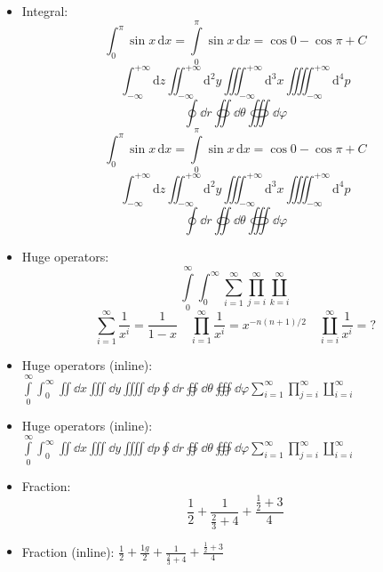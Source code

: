 \documentclass{article}
\begin{document}
\begin{itemize}
  \item Integral:
        \[
            \int_0^\pi        \sin x \, \mathrm{d} x
          = \int\limits_0^\pi \sin x \, \mathrm{d} x
          = \cos 0 - \cos\pi + C
        \]
        \[
          \int_{-\infty}^{+\infty}    \mathrm{d} z
          \iint_{-\infty}^{+\infty}   \mathrm{d}^2 y
          \iiint_{-\infty}^{+\infty}  \mathrm{d}^3 x
          \iiiint_{-\infty}^{+\infty} \mathrm{d}^4 p
        \]
        \[ \oint \dd{r} \oiint \dd{\theta} \oiiint \dd{\varphi}\]
        \begingroup
          \[
              \int_0^\pi        \sin x \, \mathrm{d} x
            = \int\limits_0^\pi \sin x \, \mathrm{d} x
            = \cos 0 - \cos\pi + C
          \]
          \[
            \int_{-\infty}^{+\infty}    \mathrm{d} z
            \iint_{-\infty}^{+\infty}   \mathrm{d}^2 y
            \iiint_{-\infty}^{+\infty}  \mathrm{d}^3 x
            \iiiint_{-\infty}^{+\infty} \mathrm{d}^4 p
          \]
          \[ \oint \dd{r} \oiint \dd{\theta} \oiiint \dd{\varphi} \]
        \endgroup

  \item Huge operators:
        \[
          \int\limits_0^\infty \int_0^\infty
          \sum_{i=1}^\infty \prod_{j=i}^\infty \coprod_{k=i}^\infty
        \]
        \[
          \sum_{i=1}^\infty    \frac{1}{x^i} = \frac{1}{1-x} \quad
          \prod_{i=1}^\infty   \frac{1}{x^i} = x^{-n(n+1)/2} \quad
          \coprod_{i=i}^\infty \frac{1}{x^i} = ?
        \]

  \item Huge operators (inline):
        $ \int\limits_0^\infty \int_0^\infty \iint \dd{x} \iiint \dd{y} \iiiint \dd{p}
          \oint \dd{r} \oiint \dd{\theta} \oiiint \dd{\varphi}
          \sum_{i=1}^\infty \prod_{j=i}^\infty \coprod_{i=i}^\infty $

  \item Huge operators (inline):
        \begingroup
          $ \int\limits_0^\infty \int_0^\infty \iint \dd{x} \iiint \dd{y} \iiiint \dd{p}
            \oint \dd{r} \oiint \dd{\theta} \oiiint \dd{\varphi}
            \sum_{i=1}^\infty \prod_{j=i}^\infty \coprod_{i=i}^\infty $
        \endgroup

  \item Fraction:
        \[ \frac{1}{2} + \frac{1}{\frac{2}{3}+4} + \frac{\frac{1}{2}+3}{4} \]

  \item Fraction (inline):
        $ \frac{1}{2} + \frac{1g}{2} + \frac{1}{\frac{2}{3}+4} + \frac{\frac{1}{2}+3}{4} $


\end{itemize}
\end{document}
